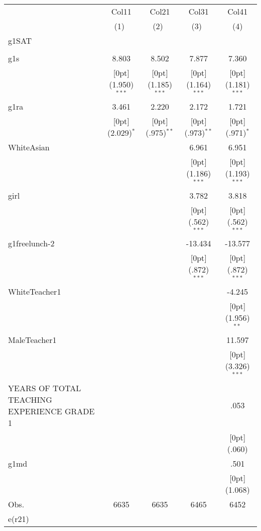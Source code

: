 \begin{tabular*}{\textwidth}{@{\extracolsep{\fill}}lcccc}				
	& \multicolumn{1}{c}{Col11} &	\multicolumn{1}{c}{Col21} &	\multicolumn{1}{c}{Col31} &	\multicolumn{1}{c}{Col41} \\
\cline{2-5}				
	& \multicolumn{1}{c}{(1)\mbox{\ }} &	\multicolumn{1}{c}{(2)\mbox{\ }} &	\multicolumn{1}{c}{(3)\mbox{\ }} &	\multicolumn{1}{c}{(4)} \\
\hline				
g1SAT &	&	&	&	\\
&	&	&	&	\\
g1s &	8.803 &	8.502 &	7.877 &	7.360 \\
&	\raisebox{.7ex}[0pt]{\scriptsize (1.950)$^{***}$} &	\raisebox{.7ex}[0pt]{\scriptsize (1.185)$^{***}$} &	\raisebox{.7ex}[0pt]{\scriptsize (1.164)$^{***}$} &	\raisebox{.7ex}[0pt]{\scriptsize (1.181)$^{***}$} \\
g1ra &	3.461 &	2.220 &	2.172 &	1.721 \\
&	\raisebox{.7ex}[0pt]{\scriptsize (2.029)$^{*}$} &	\raisebox{.7ex}[0pt]{\scriptsize (.975)$^{**}$} &	\raisebox{.7ex}[0pt]{\scriptsize (.973)$^{**}$} &	\raisebox{.7ex}[0pt]{\scriptsize (.971)$^{*}$} \\
WhiteAsian &	&	&	6.961 &	6.951 \\
&	&	&	\raisebox{.7ex}[0pt]{\scriptsize (1.186)$^{***}$} &	\raisebox{.7ex}[0pt]{\scriptsize (1.193)$^{***}$} \\
girl &	&	&	3.782 &	3.818 \\
&	&	&	\raisebox{.7ex}[0pt]{\scriptsize (.562)$^{***}$} &	\raisebox{.7ex}[0pt]{\scriptsize (.562)$^{***}$} \\
g1freelunch-2 &	&	&	-13.434 &	-13.577 \\
&	&	&	\raisebox{.7ex}[0pt]{\scriptsize (.872)$^{***}$} &	\raisebox{.7ex}[0pt]{\scriptsize (.872)$^{***}$} \\
WhiteTeacher1 &	&	&	&	-4.245 \\
&	&	&	&	\raisebox{.7ex}[0pt]{\scriptsize (1.956)$^{**}$} \\
MaleTeacher1 &	&	&	&	11.597 \\
&	&	&	&	\raisebox{.7ex}[0pt]{\scriptsize (3.326)$^{***}$} \\
YEARS OF TOTAL TEACHING EXPERIENCE GRADE 1 &	&	&	&	.053 \\
&	&	&	&	\raisebox{.7ex}[0pt]{\scriptsize (.060)} \\
g1md &	&	&	&	.501 \\
&	&	&	&	\raisebox{.7ex}[0pt]{\scriptsize (1.068)} \\
Obs. &	6635 &	6635 &	6465 &	6452 \\
e(r21) &	&	&	&	\\
\hline\hline				
\end{tabular*}%
